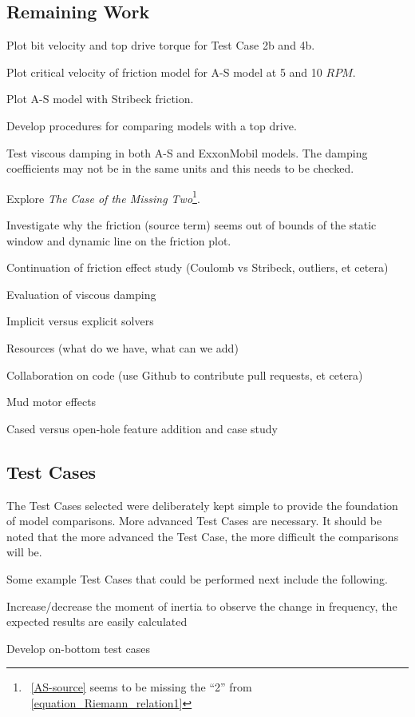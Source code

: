 \subsection{Remaining Work}
\begin{bulletedlist}
	\item Plot bit velocity and top drive torque for Test Case 2b and 4b.
	\item Plot critical velocity of friction model for A-S model at 5 and 10 $RPM$.
	\item Plot A-S model with Stribeck friction.
	\item Develop procedures for comparing models with a top drive.
	\item Test viscous damping in both A-S and ExxonMobil models.  The damping coefficients may not be in the same units and this needs to be checked.
	\item Explore \emph{The Case of the Missing Two}\footnote{\equationname~\ref{AS-source} seems to be missing the ``2'' from \equationname~\ref{equation_Riemann_relation1}}.
	\item Investigate why the friction (source term) seems out of bounds of the static window and dynamic line on the friction plot.
	\item Continuation of friction effect study (Coulomb vs Stribeck, outliers, et cetera)
	\item Evaluation of viscous damping
	\item Implicit versus explicit solvers
	\item Resources (what do we have, what can we add)
	\item Collaboration on code (use Github to contribute pull requests, et cetera)
	\item Mud motor effects
	\item Cased versus open-hole feature addition and case study
\end{bulletedlist}

\subsection{Test Cases}
The Test Cases selected were deliberately kept simple to provide the foundation of model comparisons.  More advanced Test Cases are necessary.  It should be noted that the more advanced the Test Case, the more difficult the comparisons will be.

Some example Test Cases that could be performed next include the following.
\begin{bulletedlist}
	\item Increase/decrease the moment of inertia to observe the change in frequency, the expected results are easily calculated
	\item Develop on-bottom test cases
\end{bulletedlist}

